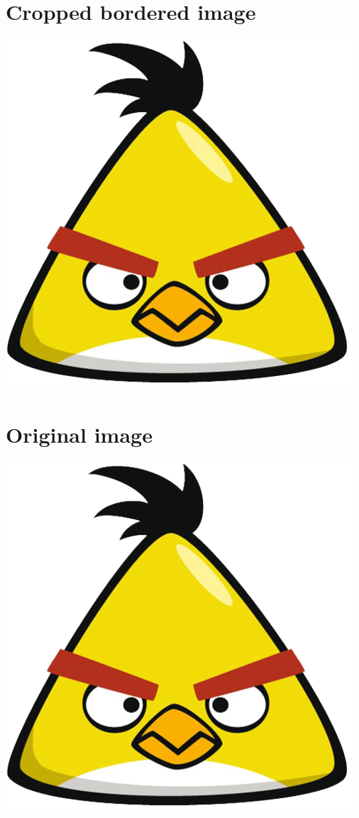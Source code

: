 \documentclass{article}
\begin{document}
	\section{Cropped bordered image}
	\includegraphics[scale=0.2, clip=true, trim=1mm 1mm 1mm 1mm]{bird.png}
	
	\section{Original image}
	\includegraphics{bird.png}
\end{document}
